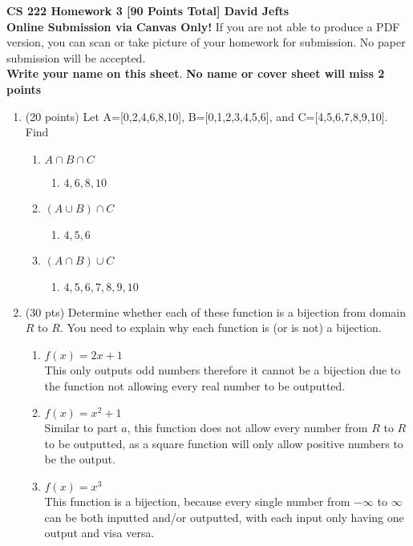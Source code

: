 \documentclass[11pt]{article}
\begin{document}
{\Large {\bf CS 222 Homework 3 [90 Points Total] \hfill David Jefts}}\\

\noindent \textbf{Online Submission via Canvas Only!} If you are not able to produce a PDF version, you can scan or take picture of your homework for submission. No paper submission will be accepted.\\

\noindent \textbf{Write your name on this sheet}. \textbf{No name or cover sheet will miss 2 points}

\begin{enumerate}
    \item (20 points) Let A=[0,2,4,6,8,10], B=[0,1,2,3,4,5,6], and C=[4,5,6,7,8,9,10]. Find
    \begin{enumerate}
    	\item $A\cap B\cap C$
	\begin{enumerate}
	  \item $4, 6, 8, 10$
	  \end{enumerate}
    	\item $(A\cup B)\cap C$
	\begin{enumerate}
	  \item $4, 5, 6$
	  \end{enumerate}
    	\item $(A\cap B)\cup C$
	\begin{enumerate}
	  \item $4, 5, 6, 7, 8, 9, 10$
	  \end{enumerate}
	\end{enumerate}
   

    \item (30 pts) Determine whether each of these function is a bijection from domain $R$ to $R$. You need to explain why each function is (or is not) a bijection.
    \begin{enumerate}
    	\item $f(x)=2x+1$\\
	\indent This only outputs odd numbers therefore it cannot be a bijection due to the function not allowing every real number to be outputted.
    	\item $f(x)=x^2+1$\\
	\indent Similar to part $a$, this function does not allow every number from $R$ to $R$ to be outputted, as a square function will only allow positive numbers to be the output. 
    	\item $f(x)=x^3$\\
	\indent This function is a bijection, because every single number from $-\infty$ to $\infty$ can be both inputted and/or outputted, with each input only having one output and visa versa.
    \end{enumerate}


\end{enumerate}
\end{document}
